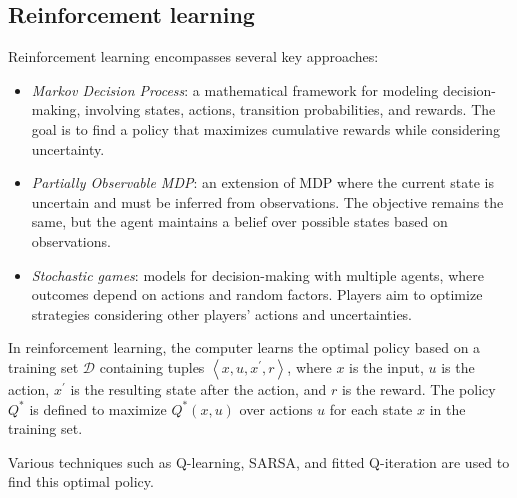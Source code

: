 \subsection{Reinforcement learning}
Reinforcement learning encompasses several key approaches:
\begin{itemize}
    \item \textit{Markov Decision Process}: a mathematical framework for modeling decision-making, involving states, actions, transition probabilities, and rewards. 
        The goal is to find a policy that maximizes cumulative rewards while considering uncertainty.
    \item \textit{Partially Observable MDP}: an extension of MDP where the current state is uncertain and must be inferred from observations. 
        The objective remains the same, but the agent maintains a belief over possible states based on observations.
    \item \textit{Stochastic games}: models for decision-making with multiple agents, where outcomes depend on actions and random factors. 
        Players aim to optimize strategies considering other players' actions and uncertainties.
\end{itemize}
In reinforcement learning, the computer learns the optimal policy based on a training set $\mathcal{D}$ containing tuples $\left\langle x,u,x^\prime,r \right\rangle$, where $x$ is the input, $u$ is the action, $x^\prime$ is the resulting state after the action, and $r$ is the reward.
The policy $Q^\ast$ is defined to maximize $Q^\ast(x,u)$ over actions $u$ for each state $x$ in the training set. 

Various techniques such as Q-learning, SARSA, and fitted Q-iteration are used to find this optimal policy.
